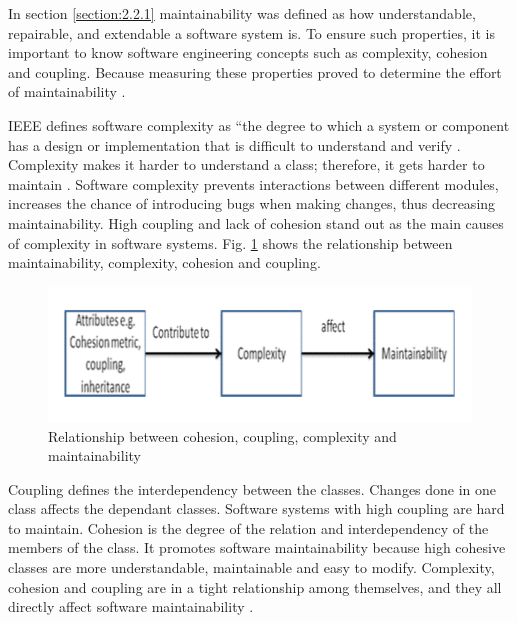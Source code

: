 In section \ref{section:2.2.1} maintainability was defined as how understandable, repairable, and extendable a software system is. To ensure such properties, it is important to know software engineering concepts such as complexity, cohesion and coupling. Because measuring these properties proved to determine the effort of maintainability \cite{33}.

IEEE defines software complexity as “the degree to which a system or component has a design or implementation that is difficult to understand and verify \cite{20}. Complexity makes it harder to understand a class; therefore, it gets harder to maintain \cite{59}. Software complexity prevents interactions between different modules, increases the chance of introducing bugs when making changes, thus decreasing maintainability. High coupling and lack of cohesion stand out as the main causes of complexity in software systems. Fig. \ref{fig:maintainability_factors} shows the relationship between maintainability, complexity, cohesion and coupling.

\begin{figure}[ht!]
    \centering
    \includegraphics[scale=0.6]{figures/maintainability_factors.png}
    \caption{Relationship between cohesion, coupling, complexity and maintainability \protect\cite{33}}
    \label{fig:maintainability_factors}
\end{figure}
 
Coupling defines the interdependency between the classes. Changes done in one class affects the dependant classes. Software systems with high coupling are hard to maintain. Cohesion is the degree of the relation and interdependency of the members of the class. It promotes software maintainability because high cohesive classes are more understandable, maintainable and easy to modify.
Complexity, cohesion and coupling are in a tight relationship among themselves, and they all directly affect software maintainability \cite{33}. 

